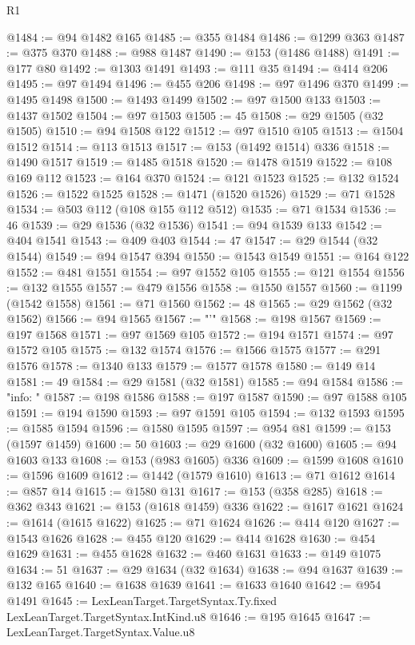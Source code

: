 \begin{lexlean}{R1}
\begin{coremodule}
{{{{{{{{{{{{{{{{{{{{{{{{{{{{{{{{{{{{{{{{{{{{{{{{{{{{{{{{{{{{{{{{{{{{{{{{{{{{{{{{{{{{{{{{{{{{{{{{{{{{{{{{{{{{{{{{{{{{{{{{{{{{{{{{{{{{{{{{{{{{{{{{{{{{{{{{{{{{{{{{{{{{{{{{{{{{{{{{{{{{{{{{{{@1484 := @94 @1482 @165
@1485 := @355 @1484
@1486 := @1299 @363
@1487 := @375 @370
@1488 := @988 @1487
@1490 := @153 (@1486 @1488)
@1491 := @177 @80
@1492 := @1303 @1491
@1493 := @111 @35
@1494 := @414 @206
@1495 := @97 @1494
@1496 := @455 @206
@1498 := @97 @1496 @370
@1499 := @1495 @1498
@1500 := @1493 @1499
@1502 := @97 @1500 @133
@1503 := @1437 @1502
@1504 := @97 @1503
@1505 := 45
@1508 := @29 @1505 (@32 @1505)
@1510 := @94 @1508 @122
@1512 := @97 @1510 @105
@1513 := @1504 @1512
@1514 := @113 @1513
@1517 := @153 (@1492 @1514) @336
@1518 := @1490 @1517
@1519 := @1485 @1518
@1520 := @1478 @1519
@1522 := @108 @169 @112
@1523 := @164 @370
@1524 := @121 @1523
@1525 := @132 @1524
@1526 := @1522 @1525
@1528 := @1471 (@1520 @1526)
@1529 := @71 @1528
@1534 := @503 @112 (@108 @155 @112 @512)
@1535 := @71 @1534
@1536 := 46
@1539 := @29 @1536 (@32 @1536)
@1541 := @94 @1539 @133
@1542 := @404 @1541
@1543 := @409 @403
@1544 := 47
@1547 := @29 @1544 (@32 @1544)
@1549 := @94 @1547 @394
@1550 := @1543 @1549
@1551 := @164 @122
@1552 := @481 @1551
@1554 := @97 @1552 @105
@1555 := @121 @1554
@1556 := @132 @1555
@1557 := @479 @1556
@1558 := @1550 @1557
@1560 := @1199 (@1542 @1558)
@1561 := @71 @1560
@1562 := 48
@1565 := @29 @1562 (@32 @1562)
@1566 := @94 @1565
@1567 := "'"
@1568 := @198 @1567
@1569 := @197 @1568
@1571 := @97 @1569 @105
@1572 := @194 @1571
@1574 := @97 @1572 @105
@1575 := @132 @1574
@1576 := @1566 @1575
@1577 := @291 @1576
@1578 := @1340 @133
@1579 := @1577 @1578
@1580 := @149 @14
@1581 := 49
@1584 := @29 @1581 (@32 @1581)
@1585 := @94 @1584
@1586 := "info: "
@1587 := @198 @1586
@1588 := @197 @1587
@1590 := @97 @1588 @105
@1591 := @194 @1590
@1593 := @97 @1591 @105
@1594 := @132 @1593
@1595 := @1585 @1594
@1596 := @1580 @1595
@1597 := @954 @81
@1599 := @153 (@1597 @1459)
@1600 := 50
@1603 := @29 @1600 (@32 @1600)
@1605 := @94 @1603 @133
@1608 := @153 (@983 @1605) @336
@1609 := @1599 @1608
@1610 := @1596 @1609
@1612 := @1442 (@1579 @1610)
@1613 := @71 @1612
@1614 := @857 @14
@1615 := @1580 @131
@1617 := @153 (@358 @285)
@1618 := @362 @343
@1621 := @153 (@1618 @1459) @336
@1622 := @1617 @1621
@1624 := @1614 (@1615 @1622)
@1625 := @71 @1624
@1626 := @414 @120
@1627 := @1543 @1626
@1628 := @455 @120
@1629 := @414 @1628
@1630 := @454 @1629
@1631 := @455 @1628
@1632 := @460 @1631
@1633 := @149 @1075
@1634 := 51
@1637 := @29 @1634 (@32 @1634)
@1638 := @94 @1637
@1639 := @132 @165
@1640 := @1638 @1639
@1641 := @1633 @1640
@1642 := @954 @1491
@1645 := LexLeanTarget.TargetSyntax.Ty.fixed LexLeanTarget.TargetSyntax.IntKind.u8
@1646 := @195 @1645
@1647 := LexLeanTarget.TargetSyntax.Value.u8
}}}}}}}}}}}}}}}}}}}}}}}}}}}}}}}}}}}}}}}}}}}}}}}}}}}}}}}}}}}}}}}}}}}}}}}}}}}}}}}}}}}}}}}}}}}}}}}}}}}}}}}}}}}}}}}}}}}}}}}}}}}}}}}}}}}}}}}}}}}}}}}}}}}}}}}}}}}}}}}}}}}}}}}}}}}}}}}}}}}}}}}}}}
\end{coremodule}
\end{lexlean}
